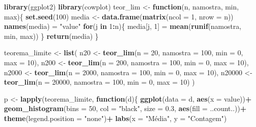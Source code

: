 \documentclass[
]{book}
\newenvironment{Shaded}{\begin{snugshade}}{\end{snugshade}}
\newcommand{\ControlFlowTok}[1]{\textcolor[rgb]{0.13,0.29,0.53}{\textbf{#1}}}
\newcommand{\DataTypeTok}[1]{\textcolor[rgb]{0.13,0.29,0.53}{#1}}
\newcommand{\DecValTok}[1]{\textcolor[rgb]{0.00,0.00,0.81}{#1}}
\newcommand{\FloatTok}[1]{\textcolor[rgb]{0.00,0.00,0.81}{#1}}
\newcommand{\KeywordTok}[1]{\textcolor[rgb]{0.13,0.29,0.53}{\textbf{#1}}}
\newcommand{\NormalTok}[1]{#1}
\newcommand{\OperatorTok}[1]{\textcolor[rgb]{0.81,0.36,0.00}{\textbf{#1}}}
\newcommand{\StringTok}[1]{\textcolor[rgb]{0.31,0.60,0.02}{#1}}
\numberwithin{equation}{section}
\begin{document}
\begin{Shaded}
\begin{Highlighting}[]
\KeywordTok{library}\NormalTok{(ggplot2)}
\KeywordTok{library}\NormalTok{(cowplot)}
\NormalTok{teor\_lim \textless{}{-}}\StringTok{ }\ControlFlowTok{function}\NormalTok{(n, namostra, min, max)\{}
  \KeywordTok{set.seed}\NormalTok{(}\DecValTok{100}\NormalTok{)}
\NormalTok{  media \textless{}{-}}\StringTok{ }\KeywordTok{data.frame}\NormalTok{(}\KeywordTok{matrix}\NormalTok{(}\DataTypeTok{ncol =} \DecValTok{1}\NormalTok{, }\DataTypeTok{nrow =}\NormalTok{ n))}
  \KeywordTok{names}\NormalTok{(media) =}\StringTok{ "value"}
  \ControlFlowTok{for}\NormalTok{(j }\ControlFlowTok{in} \DecValTok{1}\OperatorTok{:}\NormalTok{n)\{}
\NormalTok{    media[j, }\DecValTok{1}\NormalTok{] =}\StringTok{ }\KeywordTok{mean}\NormalTok{(}\KeywordTok{runif}\NormalTok{(namostra, min, max))}
\NormalTok{  \}}
  \KeywordTok{return}\NormalTok{(media)}
\NormalTok{\}}

\NormalTok{teorema\_limite \textless{}{-}}\StringTok{ }\KeywordTok{list}\NormalTok{(}
\NormalTok{  n20 \textless{}{-}}\StringTok{ }\KeywordTok{teor\_lim}\NormalTok{(}\DataTypeTok{n =} \DecValTok{20}\NormalTok{, }\DataTypeTok{namostra =} \DecValTok{100}\NormalTok{, }\DataTypeTok{min =} \DecValTok{0}\NormalTok{, }\DataTypeTok{max =} \DecValTok{10}\NormalTok{),}
\NormalTok{  n200 \textless{}{-}}\StringTok{ }\KeywordTok{teor\_lim}\NormalTok{(}\DataTypeTok{n =} \DecValTok{200}\NormalTok{, }\DataTypeTok{namostra =} \DecValTok{100}\NormalTok{, }\DataTypeTok{min =} \DecValTok{0}\NormalTok{, }\DataTypeTok{max =} \DecValTok{10}\NormalTok{),}
\NormalTok{  n2000 \textless{}{-}}\StringTok{ }\KeywordTok{teor\_lim}\NormalTok{(}\DataTypeTok{n =} \DecValTok{2000}\NormalTok{, }\DataTypeTok{namostra =} \DecValTok{100}\NormalTok{, }\DataTypeTok{min =} \DecValTok{0}\NormalTok{, }\DataTypeTok{max =} \DecValTok{10}\NormalTok{),}
\NormalTok{  n20000 \textless{}{-}}\StringTok{ }\KeywordTok{teor\_lim}\NormalTok{(}\DataTypeTok{n =} \DecValTok{20000}\NormalTok{, }\DataTypeTok{namostra =} \DecValTok{100}\NormalTok{, }\DataTypeTok{min =} \DecValTok{0}\NormalTok{, }\DataTypeTok{max =} \DecValTok{10}\NormalTok{)}
\NormalTok{)}

\NormalTok{p \textless{}{-}}\StringTok{ }\KeywordTok{lapply}\NormalTok{(teorema\_limite, }\ControlFlowTok{function}\NormalTok{(d)\{}
  \KeywordTok{ggplot}\NormalTok{(}\DataTypeTok{data =}\NormalTok{ d, }\KeywordTok{aes}\NormalTok{(}\DataTypeTok{x =}\NormalTok{ value))}\OperatorTok{+}
\StringTok{    }\KeywordTok{geom\_histogram}\NormalTok{(}\DataTypeTok{bins =} \DecValTok{50}\NormalTok{,}
                   \DataTypeTok{col =} \StringTok{"black"}\NormalTok{,}
                   \DataTypeTok{size =} \FloatTok{0.3}\NormalTok{,}
                   \KeywordTok{aes}\NormalTok{(}\DataTypeTok{fill =}\NormalTok{ ..count..))}\OperatorTok{+}
\StringTok{    }\KeywordTok{theme}\NormalTok{(}\DataTypeTok{legend.position =} \StringTok{"none"}\NormalTok{)}\OperatorTok{+}
\StringTok{    }\KeywordTok{labs}\NormalTok{(}\DataTypeTok{x =} \StringTok{"Média"}\NormalTok{, }\DataTypeTok{y =} \StringTok{"Contagem"}\NormalTok{)}
  

\end{Highlighting}
\end{Shaded}
\end{document}

